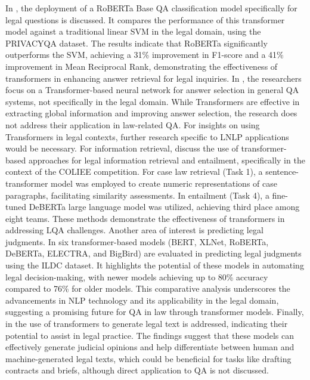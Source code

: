 \documentclass[runningheads]{llncs}
\begin{document}
In \cite{Vold_Conrad_2021}, the deployment of a RoBERTa Base QA
classification model specifically for legal questions is discussed.
It compares the performance of this transformer model against a
traditional linear SVM in the legal domain, using the PRIVACYQA
dataset. The results indicate that RoBERTa significantly outperforms
the SVM, achieving a 31\% improvement in F1-score and a 41\%
improvement in Mean Reciprocal Rank, demonstrating the effectiveness
of transformers in enhancing answer retrieval for legal inquiries. In
\cite{Shao_Guo_Chen_Zepeng_2019}, the researchers focus on a
Transformer-based neural network for answer selection in general QA
systems, not specifically in the legal domain. While Transformers are
effective in extracting global information and improving answer
selection, the research does not address their application in
law-related QA. For insights on using Transformers in legal contexts,
further research specific to LNLP applications would be necessary. For
information retrieval, \cite{Kim_Rabelo_Babiker_Rahman_Goebel_2024}
discuss the use of transformer-based approaches for legal information
retrieval and entailment, specifically in the context of the COLIEE
competition. For case law retrieval (Task 1), a sentence-transformer
model was employed to create numeric representations of case
paragraphs, facilitating similarity assessments. In entailment (Task
4), a fine-tuned DeBERTa large language model was utilized, achieving
third place among eight teams. These methods demonstrate the
effectiveness of transformers in addressing LQA challenges. Another
area of interest is predicting legal judgments. In
\cite{Ghosh_Kumar_2024} six transformer-based models (BERT, XLNet,
RoBERTa, DeBERTa, ELECTRA, and BigBird) are evaluated in predicting
legal judgments using the ILDC dataset. It highlights the potential of
these models in automating legal decision-making, with newer models
achieving up to 80\% accuracy compared to 76\% for older models. This
comparative analysis underscores the advancements in NLP technology
and its applicability in the legal domain, suggesting a promising
future for QA in law through transformer models. Finally, in
\cite{Peric_Mijic_Stammbach_Ash_2020} the use of transformers to
generate legal text is addressed, indicating their potential to assist
in legal practice. The findings suggest that these models can
effectively generate judicial opinions and help differentiate between
human and machine-generated legal texts, which could be beneficial for
tasks like drafting contracts and briefs, although direct application
to QA is not discussed.
\end{document}
